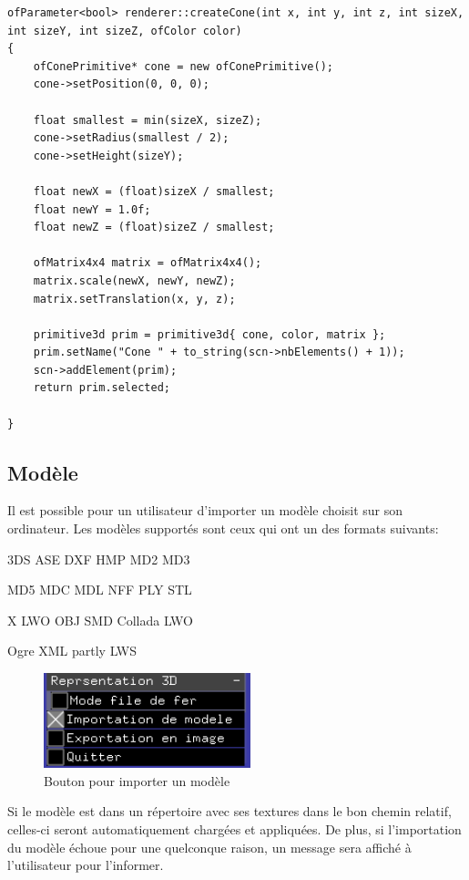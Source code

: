 \begin{lstlisting}
ofParameter<bool> renderer::createCone(int x, int y, int z, int sizeX, int sizeY, int sizeZ, ofColor color)
{
	ofConePrimitive* cone = new ofConePrimitive();
	cone->setPosition(0, 0, 0);
	
	float smallest = min(sizeX, sizeZ);
	cone->setRadius(smallest / 2);
	cone->setHeight(sizeY);
	
	float newX = (float)sizeX / smallest;
	float newY = 1.0f;
	float newZ = (float)sizeZ / smallest;
	
	ofMatrix4x4 matrix = ofMatrix4x4();
	matrix.scale(newX, newY, newZ);
	matrix.setTranslation(x, y, z);
	
	primitive3d prim = primitive3d{ cone, color, matrix };
	prim.setName("Cone " + to_string(scn->nbElements() + 1));
	scn->addElement(prim);
	return prim.selected;
	
}
\end{lstlisting}

\subsection{Modèle}

Il est possible pour un utilisateur d'importer un modèle choisit sur son ordinateur. Les modèles supportés sont ceux qui ont un des formats suivants:

\begin{list}{}{}
	\item 3DS \tab ASE \tab DXF \tab HMP \tab MD2 \tab MD3
	\item MD5 \tab MDC \tab MDL \tab NFF \tab PLY \tab STL 
	\item X \tab LWO \tab OBJ \tab SMD \tab Collada \tab LWO
	\item Ogre XML \tab partly LWS
\end{list}

\begin{figure}[h]
	\centering
	\includegraphics[width=6cm]{fig/importerModele.png}
	\caption{Bouton pour importer un modèle}
	\label{fig:test}
\end{figure}

Si le modèle est dans un répertoire avec ses textures dans le bon chemin relatif, celles-ci seront automatiquement chargées et appliquées. De plus, si l'importation du modèle échoue pour une quelconque raison, un message sera affiché à l'utilisateur pour l'informer.

